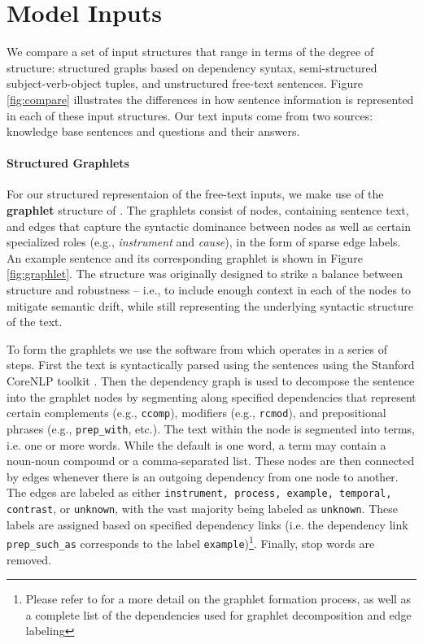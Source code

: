 \section{Model Inputs}
\label{sec:inputs}

We compare a set of input structures that range in terms of the degree of structure: structured graphs based on dependency syntax, semi-structured subject-verb-object tuples, and unstructured free-text sentences.  Figure \ref{fig:compare} illustrates the differences in how sentence information is represented in each of these input structures.  Our text inputs come from two sources: knowledge base sentences and questions and their answers. 

\paragraph{Structured Graphlets}

For our structured representaion of the free-text inputs, we make use of the \textbf{graphlet} structure of \citet{jansen2017framing}.  The graphlets consist of nodes, containing sentence text, and edges that capture the syntactic dominance between nodes as well as certain specialized roles (e.g., \emph{instrument} and \emph{cause}), in the form of sparse edge labels.  An example sentence and its corresponding graphlet is shown in Figure \ref{fig:graphlet}.   
The structure was originally designed to strike a balance between structure and robustness -- i.e., to include enough context in each of the nodes to mitigate semantic drift, while still representing the underlying syntactic structure of the text.  %

To form the graphlets we use the software from \citet{jansen2017framing} which operates in a series of steps.  First the text is syntactically parsed using the sentences using the Stanford CoreNLP toolkit \cite{manning2014stanford}.  Then the dependency graph is used to decompose the sentence into the graphlet nodes by segmenting along specified dependencies that represent certain complements (e.g., \texttt{ccomp}), modifiers (e.g., \texttt{rcmod}), and prepositional phrases (e.g., \texttt{prep\_with}, etc.).  The text within the node is segmented into terms, i.e. one or more words.  While the default is one word, a term may contain a noun-noun compound or a comma-separated list.  These nodes are then connected by edges whenever there is an outgoing dependency from one node to another.  The edges are labeled as either \texttt{instrument, process, example, temporal, contrast}, or \texttt{unknown}, with the vast majority being labeled as \texttt{unknown}.  These labels are assigned based on specified dependency links (i.e. the dependency link \texttt{prep\_such\_as} corresponds to the label \texttt{example})\footnote{Please refer to \citet{jansen2017framing} for a more detail on the graphlet formation process, as well as a complete list of the dependencies used for graphlet decomposition and edge labeling}.  Finally, stop words are removed.

